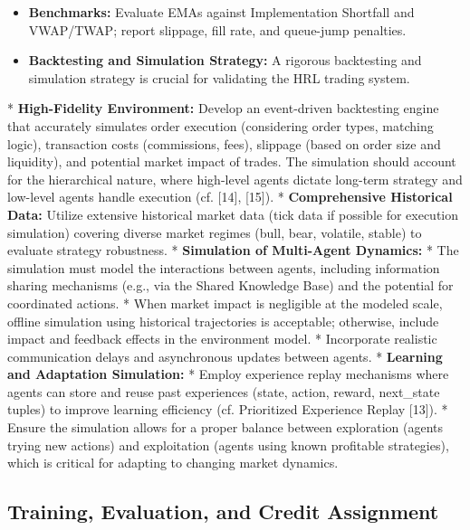 \documentclass[11pt,a4paper]{article}
\begin{document}
\begin{itemize}
\item   \textbf{Benchmarks:} Evaluate EMAs against Implementation Shortfall and VWAP/TWAP; report slippage, fill rate, and queue-jump penalties.

\item   \textbf{Backtesting and Simulation Strategy:} A rigorous backtesting and simulation strategy is crucial for validating the HRL trading system.
\end{itemize}
    *   \textbf{High-Fidelity Environment:} Develop an event-driven backtesting engine that accurately simulates order execution (considering order types, matching logic), transaction costs (commissions, fees), slippage (based on order size and liquidity), and potential market impact of trades. The simulation should account for the hierarchical nature, where high-level agents dictate long-term strategy and low-level agents handle execution (cf. [14], [15]).
    *   \textbf{Comprehensive Historical Data:} Utilize extensive historical market data (tick data if possible for execution simulation) covering diverse market regimes (bull, bear, volatile, stable) to evaluate strategy robustness.
    *   \textbf{Simulation of Multi-Agent Dynamics:}
        *   The simulation must model the interactions between agents, including information sharing mechanisms (e.g., via the Shared Knowledge Base) and the potential for coordinated actions.
        *   When market impact is negligible at the modeled scale, offline simulation using historical trajectories is acceptable; otherwise, include impact and feedback effects in the environment model.
        *   Incorporate realistic communication delays and asynchronous updates between agents.
    *   \textbf{Learning and Adaptation Simulation:}
        *   Employ experience replay mechanisms where agents can store and reuse past experiences (state, action, reward, next\_state tuples) to improve learning efficiency (cf. Prioritized Experience Replay [13]).
        *   Ensure the simulation allows for a proper balance between exploration (agents trying new actions) and exploitation (agents using known profitable strategies), which is critical for adapting to changing market dynamics.

\subsection{Training, Evaluation, and Credit Assignment}
\end{document}
